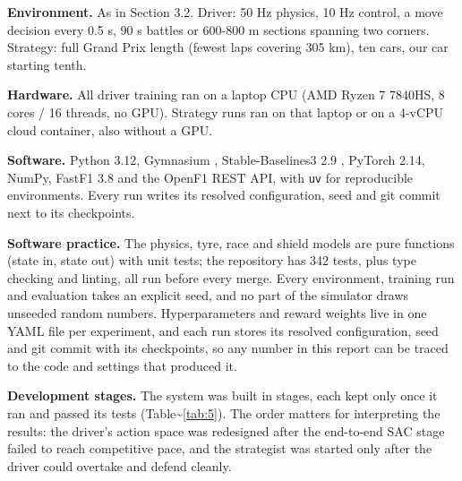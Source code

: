 \documentclass{ieeeaccess}
\begin{document}
\textbf{Environment.} As in Section 3.2. Driver: 50 Hz physics, 10 Hz control, a move
decision every 0.5 s, 90 s battles or 600-800 m sections spanning two corners.
Strategy: full Grand Prix length (fewest laps covering 305 km), ten cars, our car
starting tenth.

\textbf{Hardware.} All driver training ran on a laptop CPU (AMD Ryzen 7 7840HS, 8 cores
/ 16 threads, no GPU). Strategy runs ran on that laptop or on a 4-vCPU cloud
container, also without a GPU.

\textbf{Software.} Python 3.12, Gymnasium \cite{b35}, Stable-Baselines3 2.9 \cite{b36}, PyTorch
2.14, NumPy, FastF1 3.8 and the OpenF1 REST API, with \texttt{uv} for reproducible
environments. Every run writes its resolved configuration, seed and git commit next
to its checkpoints.

\textbf{Software practice.} The physics, tyre, race and shield models are pure
functions (state in, state out) with unit tests; the repository has 342 tests,
plus type checking and linting, all run before every merge. Every environment,
training run and evaluation takes an explicit seed, and no part of the simulator
draws unseeded random numbers. Hyperparameters and reward weights live in one YAML
file per experiment, and each run stores its resolved configuration, seed and git
commit with its checkpoints, so any number in this report can be traced to the code
and settings that produced it.

\textbf{Development stages.} The system was built in stages, each kept only once it ran
and passed its tests (Table\textasciitilde{}\ref{tab:5}). The order matters for interpreting the results: the
driver's action space was redesigned after the end-to-end SAC stage failed to reach
competitive pace, and the strategist was started only after the driver could
overtake and defend cleanly.
\end{document}
